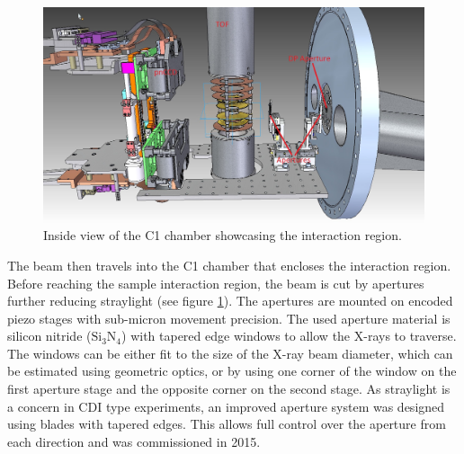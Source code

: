 \begin{figure}
	\centering
		\includegraphics[width=1.00\textwidth]{images/c1-ccd-spec.jpg}
	\caption{Inside view of the C1 chamber showcasing the interaction region.}
	\label{fig:c1-ccd-spec}
\end{figure}
The beam then travels into the C1 chamber that encloses the interaction region. Before reaching the sample interaction region, the beam is cut by apertures further reducing straylight (see figure \ref{fig:c1-ccd-spec}). The apertures are mounted on encoded piezo stages with sub-micron movement precision. The used aperture material is silicon nitride ($\text{Si}_{3}\text{N}_{4}$) with tapered edge windows to allow the X-rays to traverse. The windows can be either fit to the size of the X-ray beam diameter, which can be estimated using geometric optics, or by using one corner of the window on the first aperture stage and the opposite corner on the second stage. As straylight is a concern in CDI type experiments, an improved aperture system was designed using blades with tapered edges. This allows full control over the aperture from each direction and was commissioned in 2015.\\
